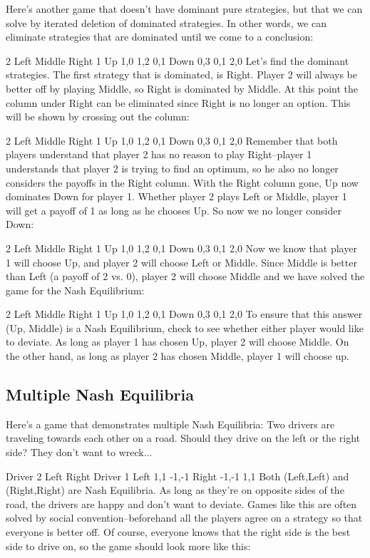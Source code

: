 Here's another game that doesn't have dominant pure strategies, but that we can solve by iterated deletion of dominated strategies. In other words, we can eliminate strategies that are dominated until we come to a conclusion:

2
Left	Middle	Right
1	Up	1,0	1,2	0,1
Down	0,3	0,1	2,0
Let's find the dominant strategies. The first strategy that is dominated, is Right. Player 2 will always be better off by playing Middle, so Right is dominated by Middle. At this point the column under Right can be eliminated since Right is no longer an option. This will be shown by crossing out the column:

2
Left	Middle	Right
1	Up	1,0	1,2	0,1
Down	0,3	0,1	2,0
Remember that both players understand that player 2 has no reason to play Right--player 1 understands that player 2 is trying to find an optimum, so he also no longer considers the payoffs in the Right column. With the Right column gone, Up now dominates Down for player 1. Whether player 2 plays Left or Middle, player 1 will get a payoff of 1 as long as he chooses Up. So now we no longer consider Down:

2
Left	Middle	Right
1	Up	1,0	1,2	0,1
Down	0,3	0,1	2,0
Now we know that player 1 will choose Up, and player 2 will choose Left or Middle. Since Middle is better than Left (a payoff of 2 vs. 0), player 2 will choose Middle and we have solved the game for the Nash Equilibrium:

2
Left	Middle	Right
1	Up	1,0	1,2	0,1
Down	0,3	0,1	2,0
To ensure that this answer (Up, Middle) is a Nash Equilibrium, check to see whether either player would like to deviate. As long as player 1 has chosen Up, player 2 will choose Middle. On the other hand, as long as player 2 has chosen Middle, player 1 will choose up.

\subsection{Multiple Nash Equilibria}

Here's a game that demonstrates multiple Nash Equilibria: Two drivers are traveling towards each other on a road. Should they drive on the left or the right side? They don't want to wreck...

Driver 2
Left	Right
Driver 1	Left	1,1	-1,-1
Right	-1,-1	1,1
Both (Left,Left) and (Right,Right) are Nash Equilibria. As long as they're on opposite sides of the road, the drivers are happy and don't want to deviate. Games like this are often solved by social convention--beforehand all the players agree on a strategy so that everyone is better off. Of course, everyone knows that the right side is the best side to drive on, so the game should look more like this:

